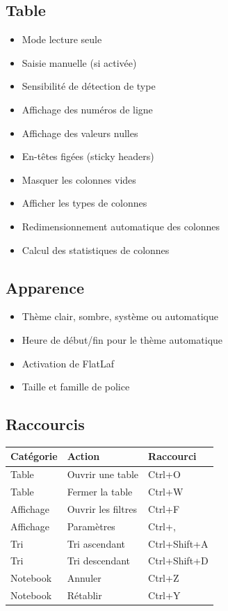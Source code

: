 \documentclass[11pt, a4paper]{article}
\begin{document}
\subsection{Table}
\begin{itemize}
    \item Mode lecture seule
    \item Saisie manuelle (si activée)
    \item Sensibilité de détection de type
    \item Affichage des numéros de ligne
    \item Affichage des valeurs nulles
    \item En-têtes figées (sticky headers)
    \item Masquer les colonnes vides
    \item Afficher les types de colonnes
    \item Redimensionnement automatique des colonnes
    \item Calcul des statistiques de colonnes
\end{itemize}

\subsection{Apparence}
\begin{itemize}
    \item Thème clair, sombre, système ou automatique
    \item Heure de début/fin pour le thème automatique
    \item Activation de FlatLaf
    \item Taille et famille de police
\end{itemize}

\subsection{Raccourcis}
\begin{tabularx}{\textwidth}{@{}l X l@{}}
\toprule
\textbf{Catégorie} & \textbf{Action} & \textbf{Raccourci} \\
\midrule
Table & Ouvrir une table & Ctrl+O \\
Table & Fermer la table & Ctrl+W \\
Affichage & Ouvrir les filtres & Ctrl+F \\
Affichage & Paramètres & Ctrl+, \\
Tri & Tri ascendant & Ctrl+Shift+A \\
Tri & Tri descendant & Ctrl+Shift+D \\
Notebook & Annuler & Ctrl+Z \\
Notebook & Rétablir & Ctrl+Y \\
\bottomrule
\end{tabularx}
\end{document}
